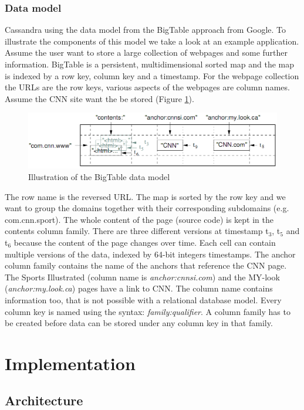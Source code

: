 \documentclass[a4paper]{article}
\begin{document}
\subsubsection{Data model}
Cassandra using the data model from the BigTable \cite{paperBigTable} approach from Google. To illustrate the components of this model we take a look at an example application. Assume the user want to store a large collection of webpages and some further information. BigTable is a persistent, multidimensional sorted map and the map is indexed by a row key, column key and a timestamp. For the webpage collection the URLs are the row keys, various aspects of the webpages are column names. Assume the CNN site want the be stored (Figure \ref{model_bigtable}).
\begin{figure}[h!]
	\centering
	\includegraphics[scale=0.4]{images/modelBigTable.png}
	\caption{Illustration of the BigTable data model}
	\label{model_bigtable}
\end{figure}
The row name is the reversed URL. The map is sorted by the row key and we want to group the domains together with their corresponding subdomains (e.g. com.cnn.sport). The whole content of the page (source code) is kept in the contents column family. There are three different versions at timestamp t$_{3}$, t$_{5}$ and t$_{6}$ because the content of the page changes over time. Each cell can contain multiple versions of the data, indexed by 64-bit integers timestamps. The anchor column family contains the name of the anchors that reference the CNN page. The Sports Illustrated (column name is \textit{anchor:cnnsi.com}) and the MY-look (\textit{anchor:my.look.ca}) pages have a link to CNN. The column name contains information too, that is not possible with a relational database model. Every column key is named using the syntax: \textit{family:qualifier}. A column family has to be created before data can be stored under any column key in that family.


\section{Implementation}
\subsection{Architecture}
\end{document}
